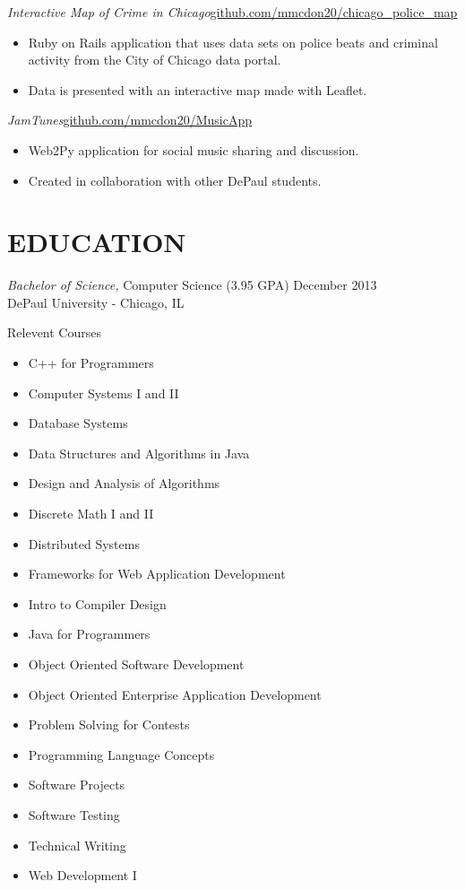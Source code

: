 \documentclass[margin]{res}
\begin{document}
\begin{resume}
  {\sl Interactive Map of Crime in Chicago}\hfill \href{http://github.com/mmcdon20/chicago\_police\_map}{github.com/mmcdon20/chicago\_police\_map}
  \begin{itemize} \itemsep -2pt
    \item Ruby on Rails application that uses data sets on police beats and criminal activity from the City of Chicago data portal.
    \item Data is presented with an interactive map made with Leaflet.
  \end{itemize}
                
  {\sl JamTunes}\hfill \href{http://github.com/mmcdon20/MusicApp}{github.com/mmcdon20/MusicApp}
    \begin{itemize} \itemsep -2pt
    \item Web2Py application for social music sharing and discussion.
    \item Created in collaboration with other DePaul students.
  \end{itemize}
                
\section{EDUCATION} 
  {\sl Bachelor of Science,} Computer Science (3.95 GPA) \hfill December 2013 \\
  DePaul University - Chicago, IL 
  \begin{multicols}{2} \centerline{Relevent Courses}
    \begin{itemize} \itemsep -2pt 
      \item C++ for Programmers
      \item Computer Systems I and II
      \item Database Systems
      \item Data Structures and Algorithms in Java
      \item Design and Analysis of Algorithms
      \item Discrete Math I and II
      \item Distributed Systems
      \item Frameworks for Web Application Development
      \item Intro to Compiler Design
      \item Java for Programmers
      \item Object Oriented Software Development
      \item Object Oriented Enterprise Application Development
      \item Problem Solving for Contests
      \item Programming Language Concepts
      \item Software Projects
      \item Software Testing
      \item Technical Writing
      \item Web Development I
    \end{itemize}
  \end{multicols}


\end{resume}
\end{document}
